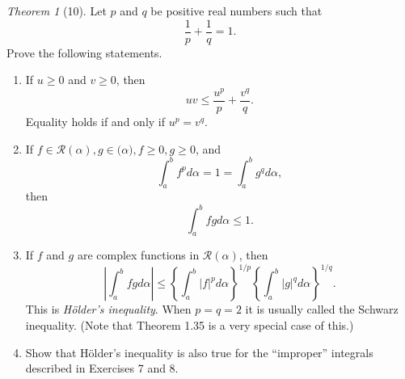 \documentclass[12pt]{article}
\theoremstyle{remark}
\theoremstyle{named}
\newtheorem*{theorem}{Theorem}
\renewcommand{\a}{\alpha}
\newcommand{\abs}[1]{|#1|}
\newcommand{\bigabs}[1]{\left|#1\right|}
\begin{document}
\begin{theorem}[10]
    Let \(p\) and \(q\) be positive real numbers such that 
    \[\frac{1}{p} + \frac{1}{q} = 1.\]
    Prove the following statements.
    \begin{enumerate}
        \item If \(u \ge 0\) and \(v \ge 0\), then 
        \[uv \le \frac{u^p}{p} + \frac{v^q}{q}.\]
        Equality holds if and only if \(u^p = v^q\). 
        \item If \(f \in \mathcal R(\a), g \in \mathcal (\a), f \ge 0, g \ge 0\), and
        \[\int_a^b f^p d\a = 1 = \int_a^b g^q d\a,\]
        then
        \[\int_a^b fg d \a \le 1.\]
        \item If \(f\) and \(g\) are complex functions in \(\mathcal R (\a)\), then 
        \[\bigabs{\int_a^b fg d \a} \le \left\{\int_a^b \abs{f}^p d\a\right\}^{1/p} \left\{\int_a^b \abs{g}^q d\a\right\}^{1/q}.\]
        This is \textit{H\"{o}lder's inequality}. When \(p = q = 2\) it is usually called the Schwarz inequality. (Note that Theorem 1.35 is a very special case of this.)
        \item Show that H\"{o}lder's inequality is also true for the ``improper'' integrals described in Exercises 7 and 8.
    \end{enumerate}
\end{theorem}
\end{document}
